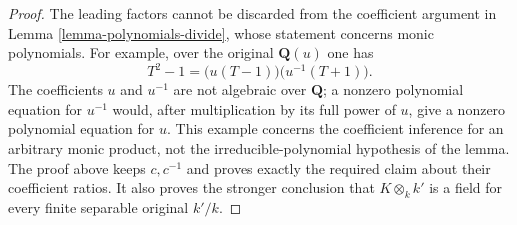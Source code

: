 \begin{proof}
The leading factors cannot be discarded
from the coefficient argument in Lemma
\ref{lemma-polynomials-divide}, whose
statement concerns monic polynomials.
For example, over the original
$\mathbf Q(u)$ one has
$$
T^2-1=\bigl(u(T-1)\bigr)\bigl(u^{-1}(T+1)\bigr).
$$
The coefficients $u$ and $u^{-1}$
are not algebraic over $\mathbf Q$;
a nonzero polynomial equation for
$u^{-1}$ would, after multiplication
by its full power of $u$, give a
nonzero polynomial equation for $u$.
This example concerns the coefficient
inference for an arbitrary monic
product, not the irreducible-polynomial
hypothesis of the lemma. The proof
above keeps $c,c^{-1}$ and proves
exactly the required claim about
their coefficient ratios. It also
proves the stronger conclusion that
$K\otimes_k k'$ is a field for every
finite separable original $k'/k$.
\end{proof}
